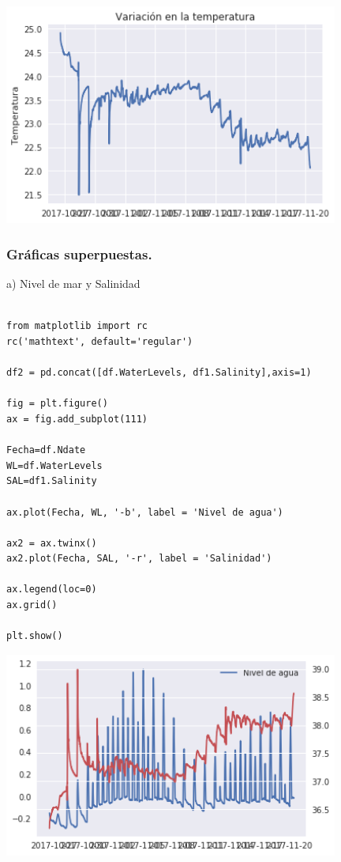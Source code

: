 \documentclass{article} %
\begin{document}
\begin{center}
 	\includegraphics[width=11cm]{tempt.png}
 \end{center}


\subsubsection{Gráficas superpuestas.}

\hspace{0.45 cm} a) Nivel de mar y Salinidad


\begin{verbatim} 

from matplotlib import rc
rc('mathtext', default='regular')

df2 = pd.concat([df.WaterLevels, df1.Salinity],axis=1)

fig = plt.figure()
ax = fig.add_subplot(111)

Fecha=df.Ndate
WL=df.WaterLevels
SAL=df1.Salinity

ax.plot(Fecha, WL, '-b', label = 'Nivel de agua')

ax2 = ax.twinx()
ax2.plot(Fecha, SAL, '-r', label = 'Salinidad')

ax.legend(loc=0)
ax.grid()

plt.show()

\end{verbatim}


\begin{center}
 	\includegraphics[width=11cm]{sobre1.png}
\end{center}
\end{document}
